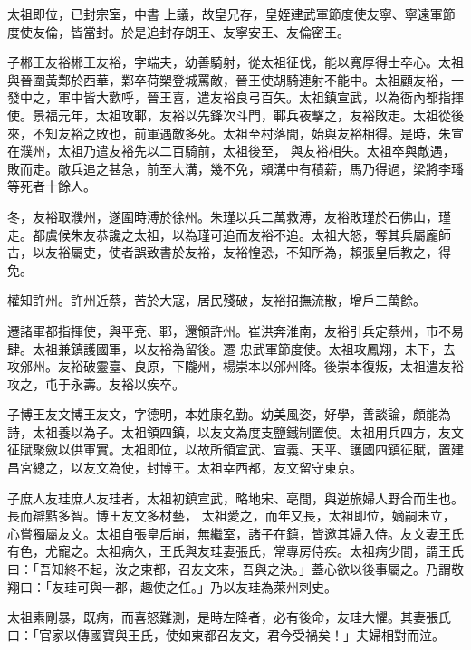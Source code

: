 \begin{pinyinscope}
 太祖即位，已封宗室，中書
 上議，故皇兄存，皇姪建武軍節度使友寧、寧遠軍節度使友倫，皆當封。於是追封存朗王、友寧安王、友倫密王。



 子郴王友裕郴王友裕，字端夫，幼善騎射，從太祖征伐，能以寬厚得士卒心。太祖與晉圍黃鄴於西華，鄴卒荷槊登城罵敵，晉王使胡騎連射不能中。太祖顧友裕，一發中之，軍中皆大歡呼，晉王喜，遣友裕良弓百矢。太祖鎮宣武，以為衙內都指揮使。景福元年，太祖攻鄆，友裕以先鋒次斗門，鄆兵夜擊之，友裕敗走。太祖從後來，不知友裕之敗也，前軍遇敵多死。太祖至村落間，始與友裕相得。是時，朱宣在濮州，太祖乃遣友裕先以二百騎前，太祖後至，
 與友裕相失。太祖卒與敵遇，敗而走。敵兵追之甚急，前至大溝，幾不免，賴溝中有積薪，馬乃得過，梁將李璠等死者十餘人。



 冬，友裕取濮州，遂圍時溥於徐州。朱瑾以兵二萬救溥，友裕敗瑾於石佛山，瑾走。都虞候朱友恭讒之太祖，以為瑾可追而友裕不追。太祖大怒，奪其兵屬龐師古，以友裕屬吏，使者誤致書於友裕，友裕惶恐，不知所為，賴張皇后教之，得免。



 權知許州。許州近蔡，苦於大寇，居民殘破，友裕招撫流散，增戶三萬餘。



 遷諸軍都指揮使，與平兗、鄆，還領許州。崔洪奔淮南，友裕引兵定蔡州，市不易肆。太祖兼鎮護國軍，以友裕為留後。遷
 忠武軍節度使。太祖攻鳳翔，未下，去攻邠州。友裕破靈臺、良原，下隴州，楊崇本以邠州降。後崇本復叛，太祖遣友裕攻之，屯于永壽。友裕以疾卒。



 子博王友文博王友文，字德明，本姓康名勤。幼美風姿，好學，善談論，頗能為詩，太祖養以為子。太祖領四鎮，以友文為度支鹽鐵制置使。太祖用兵四方，友文征賦聚斂以供軍實。太祖即位，以故所領宣武、宣義、天平、護國四鎮征賦，置建昌宮總之，以友文為使，封博王。太祖幸西都，友文留守東京。



 子庶人友珪庶人友珪者，太祖初鎮宣武，略地宋、亳間，與逆旅婦人野合而生也。長而辯黠多智。博王友文多材藝，
 太祖愛之，而年又長，太祖即位，嫡嗣未立，心嘗獨屬友文。太祖自張皇后崩，無繼室，諸子在鎮，皆邀其婦入侍。友文妻王氏有色，尤寵之。太祖病久，王氏與友珪妻張氏，常專房侍疾。太祖病少間，謂王氏曰：「吾知終不起，汝之東都，召友文來，吾與之決。」蓋心欲以後事屬之。乃謂敬翔曰：「友珪可與一郡，趣使之任。」乃以友珪為萊州刺史。



 太祖素剛暴，既病，而喜怒難測，是時左降者，必有後命，友珪大懼。其妻張氏曰：「官家以傳國寶與王氏，使如東都召友文，君今受禍矣！」夫婦相對而泣。




\end{pinyinscope}
